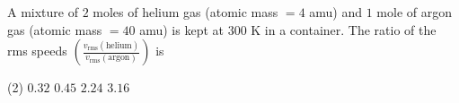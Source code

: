 
\item A mixture of \( 2 \) moles of helium gas (atomic mass \( = 4 \) amu) and \( 1 \) mole of argon gas (atomic mass \( = 40 \) amu) is kept at \( 300 \) K in a container. The ratio of the rms speeds \(\left(\frac{v_{\text{rms}}(\text{helium})}{v_{\text{rms}}(\text{argon})}\right)\) is
    \begin{tasks}(2)
        \task \( 0.32 \)
        \task \( 0.45 \)
        \task \( 2.24 \)
        \task \( 3.16 \)
    \end{tasks}
